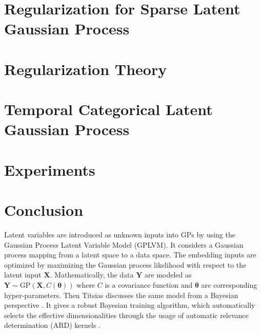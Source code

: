 \documentclass{article}
\begin{document}
\section{Regularization for Sparse Latent Gaussian Process}	

\section{Regularization Theory}

\section{Temporal Categorical Latent Gaussian Process}

\section{Experiments}

\section{Conclusion}






Latent variables are introduced as unknown inputs into GPs by \cite{Lawrence_2003} using the Gaussian Process Latent Variable Model (GPLVM). It considers a Gaussian process mapping from a latent space to a data space. The embedding inputs are optimized by maximizing the Gaussian process likelihood with respect to the latent input $\bm X$. Mathematically, the data $\bm Y$ are modeled as $\bm Y \sim \mathrm{GP}(\bm X, C(\bm{\theta}))$ where $C$ is a covariance function and $\bm \theta$ are corresponding hyper-parameters. Then Titsias discusses the same model from a Bayesian perspective \citep{Titsias_2010}. It gives a robust Bayesian training algorithm, which automatically selects the effective dimensionalities through the usage of automatic relevance determination (ARD) kernels \citep{MacKay1996}. 
\end{document}
